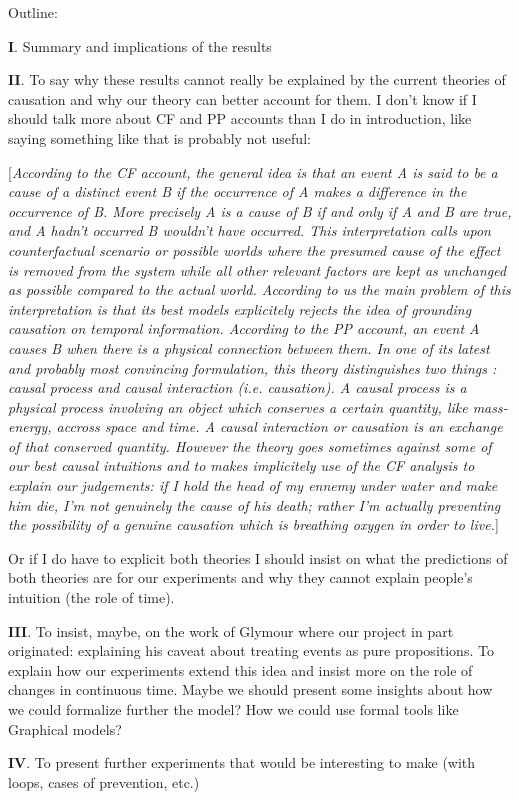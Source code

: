 \documentclass[10pt,letterpaper]{article}
\begin{document}
Outline:

\textbf{I}. Summary and implications of the results

\textbf{II}. To say why these results cannot really be explained by the current theories of causation and why our theory can better account for them. I don't know if I should talk more about CF and PP accounts than I do in introduction, like saying something like that is probably not useful:

[\textit{According to the CF account, the general idea is that an event A is said to be a cause of a distinct event B if the occurrence of A makes a difference in the occurrence of B. More precisely A is a cause of B if and only if A and B are true, and A hadn't occurred B wouldn't have occurred. This interpretation calls upon counterfactual scenario or possible worlds where the presumed cause of the effect is removed from the system while all other relevant factors are kept as unchanged as possible compared to the actual world. According to us the main problem of this interpretation is that its best models explicitely rejects the idea of grounding causation on temporal information.
According to the PP account, an event A causes B when there is a physical connection between them. In one of its latest and probably most convincing formulation, this theory distinguishes two things : causal process and causal interaction (i.e. causation). A causal process is a physical process involving an object which conserves a certain quantity, like mass-energy, accross space and time. A causal interaction or causation is an exchange of that conserved quantity. However the theory goes sometimes against some of our best causal intuitions and to makes implicitely use of the CF analysis to explain our judgements: if I hold the head of my ennemy under water and make him die, I'm not genuinely the cause of his death; rather I'm actually preventing the possibility of a genuine causation which is breathing oxygen in order to live.}]

Or if I do have to explicit both theories I should insist on what the predictions of both theories are for our experiments and why they cannot explain people's intuition (the role of time).

\textbf{III}. To insist, maybe, on the work of Glymour where our project in part originated: explaining his caveat about treating events as pure propositions. To explain how our experiments extend this idea and insist more on the role of changes in continuous time. Maybe we should present some insights about how we could formalize further the model? How we could use formal tools like Graphical models?

\textbf{IV}. To present further experiments that would be interesting to make (with loops, cases of prevention, etc.)


\nocite{halpernp01}



\setlength{\bibleftmargin}{.125in}
\setlength{\bibindent}{-\bibleftmargin}


\end{document}
